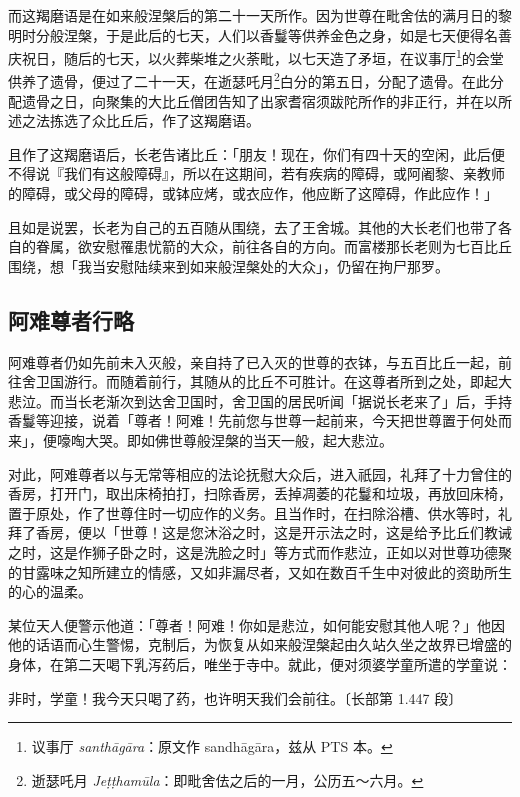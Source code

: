 而这羯磨语是在如来般涅槃后的第二十一天所作。因为世尊在毗舍佉的满月日的黎明时分般涅槃，于是此后的七天，人们以香鬘等供养金色之身，如是七天便得名善庆祝日，随后的七天，以火葬柴堆之火荼毗，以七天造了矛垣，在议事厅\footnote{议事厅 \textit{santhāgāra}：原文作 sandhāgāra，兹从 PTS 本。}的会堂供养了遗骨，便过了二十一天，在逝瑟吒月\footnote{逝瑟吒月 \textit{Jeṭṭhamūla}：即毗舍佉之后的一月，公历五～六月。}白分的第五日，分配了遗骨。在此分配遗骨之日，向聚集的大比丘僧团告知了出家耆宿须跋陀所作的非正行，并在以所述之法拣选了众比丘后，作了这羯磨语。

且作了这羯磨语后，长老告诸比丘：「朋友！现在，你们有四十天的空闲，此后便不得说『我们有这般障碍』，所以在这期间，若有疾病的障碍，或阿阇黎、亲教师的障碍，或父母的障碍，或钵应烤，或衣应作，他应断了这障碍，作此应作！」

且如是说罢，长老为自己的五百随从围绕，去了王舍城。其他的大长老们也带了各自的眷属，欲安慰罹患忧箭的大众，前往各自的方向。而富楼那长老则为七百比丘围绕，想「我当安慰陆续来到如来般涅槃处的大众」，仍留在拘尸那罗。

\subsection*{阿难尊者行略}

阿难尊者仍如先前未入灭般，亲自持了已入灭的世尊的衣钵，与五百比丘一起，前往舍卫国游行。而随着前行，其随从的比丘不可胜计。在这尊者所到之处，即起大悲泣。而当长老渐次到达舍卫国时，舍卫国的居民听闻「据说长老来了」后，手持香鬘等迎接，说着「尊者！阿难！先前您与世尊一起前来，今天把世尊置于何处而来」，便嚎啕大哭。即如佛世尊般涅槃的当天一般，起大悲泣。

对此，阿难尊者以与无常等相应的法论抚慰大众后，进入祇园，礼拜了十力曾住的香房，打开门，取出床椅拍打，扫除香房，丢掉凋萎的花鬘和垃圾，再放回床椅，置于原处，作了世尊住时一切应作的义务。且当作时，在扫除浴槽、供水等时，礼拜了香房，便以「世尊！这是您沐浴之时，这是开示法之时，这是给予比丘们教诫之时，这是作狮子卧之时，这是洗脸之时」等方式而作悲泣，正如以对世尊功德聚的甘露味之知所建立的情感，又如非漏尽者，又如在数百千生中对彼此的资助所生的心的温柔。

某位天人便警示他道：「尊者！阿难！你如是悲泣，如何能安慰其他人呢？」他因他的话语而心生警惕，克制后，为恢复从如来般涅槃起由久站久坐之故界已增盛的身体，在第二天喝下乳泻药后，唯坐于寺中。就此，便对须婆学童所遣的学童说：

\begin{quoting}非时，学童！我今天只喝了药，也许明天我们会前往。{\bluefootnotesize 〔长部第 1.447 段〕}\end{quoting}

